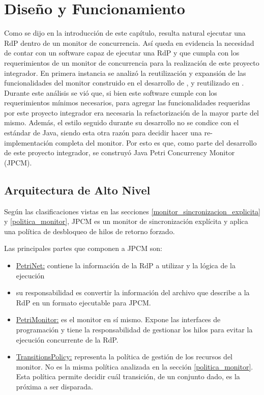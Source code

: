 \section{Diseño y Funcionamiento}

Como se dijo en la introducción de este capítulo, resulta natural ejecutar
una RdP dentro de un monitor de concurrencia. Así queda en evidencia la
necesidad de contar con un software capaz de ejecutar una RdP y que cumpla con
los requerimientos de un monitor de concurrencia para la realización de este
proyecto integrador.
En primera instancia se analizó la reutilización y expansión de las
funcionalidades del monitor construido en el desarrollo de \cite{codegen}, y
reutilizado en \cite{chimp}. Durante este análisis se vió que, si bien este
software cumple con los requerimientos mínimos necesarios, para agregar las
funcionalidades requeridas por este proyecto integrador era necesaria la
refactorización de la mayor parte del mismo. Además, el estilo seguido durante
su desarrollo no se condice con el estándar de Java, siendo esta otra razón
para decidir hacer una re-implementación completa del monitor.
Por esto es que, como parte del desarrollo de este proyecto integrador, se
construyó Java Petri Concurrency Monitor (JPCM).

\subsection{Arquitectura de Alto Nivel}

Según las clasificaciones vistas en las secciones
\ref{monitor_sincronizacion_explicita} y \ref{politica_monitor}, JPCM es un
monitor de sincronización explícita y aplica una política de desbloqueo de hilos
de retorno forzado.
 
Las principales partes que componen a JPCM son:
\begin{itemize}
  \item \underline{PetriNet:} contiene la información de la RdP a utilizar y la
  lógica de la ejecución
  \item {} su responsabilidad es
  convertir la información del archivo que describe a la RdP en un formato
  ejecutable para JPCM.
  \item \underline{PetriMonitor:} es el monitor en sí mismo. Expone las
  interfaces de programación y tiene la responsabilidad de gestionar los hilos
  para evitar la ejecución concurrente de la RdP.
  \item \underline{TransitionsPolicy:} representa la política de gestión de los
  recursos del monitor. No es la misma política analizada en la sección
  \ref{politica_monitor}. Esta política permite decidir cuál transición, de un
  conjunto dado, es la próxima a ser disparada.
\end{itemize}

